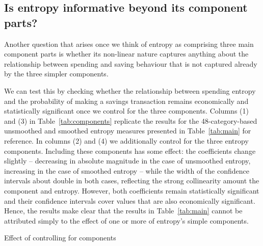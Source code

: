\subsection{Is entropy informative beyond its component parts?}%
\label{sub:is_entropy_informative_beyond_its_component_parts_}

Another question that arises once we think of entropy as comprising three main
component parts is whether its non-linear nature captures anything about the
relationship between spending and saving behaviour that is not captured already
by the three simpler components. 

We can test this by checking whether the relationship between spending entropy
and the probability of making a savings transaction remains economically and
statistically significant once we control for the three components. Columns (1)
and (3) in Table~\ref{tab:components} replicate the results for the 48-category-based
unsmoothed and smoothed entropy measures presented in Table~\ref{tab:main} for
reference. In columns (2) and (4) we additionally control for the three entropy
components. Including these components has some effect: the coefficients change
slightly -- decreasing in absolute magnitude in the case of unsmoothed entropy,
increasing in the case of smoothed entropy -- while the width of the confidence
intervals about double in both cases, reflecting the strong collinearity amount
the component and entropy. However, both coefficients remain statistically
significant and their confidence intervals cover values that are also
economically significant. Hence, the results make clear that the results in
Table~\ref{tab:main} cannot be attributed simply to the effect of one or more
of entropy's simple components.

\begin{landscape}
\begin{table}[ht]
\centering\scriptsize
\caption{Effect of controlling for components}
\label{tab:components}

\end{table}
\end{landscape}

